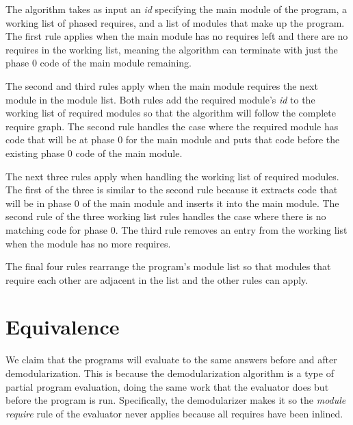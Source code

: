 The algorithm takes as input an \emph{id} specifying the main module of the program, a working list of phased requires, and a list of modules that make up the program.
The first rule applies when the main module has no requires left and there are no requires in the working list, meaning the algorithm can terminate with just the phase 0 code of the main module remaining.

The second and third rules apply when the main module requires the next module in the module list.
Both rules add the required module's \emph{id} to the working list of required modules so that the algorithm will follow the complete require graph.
The second rule handles the case where the required module has code that will be at phase 0 for the main module and puts that code before the existing phase 0 code of the main module.

The next three rules apply when handling the working list of required modules. 
The first of the three is similar to the second rule because it extracts code that will be in phase 0 of the main module and inserts it into the main module.
The second rule of the three working list rules handles the case where there is no matching code for phase 0.
The third rule removes an entry from the working list when the module has no more requires.

The final four rules rearrange the program's module list so that modules that require each other are adjacent in the list and the other rules can apply.

\section{Equivalence}
We claim that the programs will evaluate to the same answers before and after demodularization. 
This is because the demodularization algorithm is a type of partial program evaluation, doing the same work that the evaluator does but before the program is run.
Specifically, the demodularizer makes it so the \emph{module require} rule of the evaluator never applies because all requires have been inlined.

